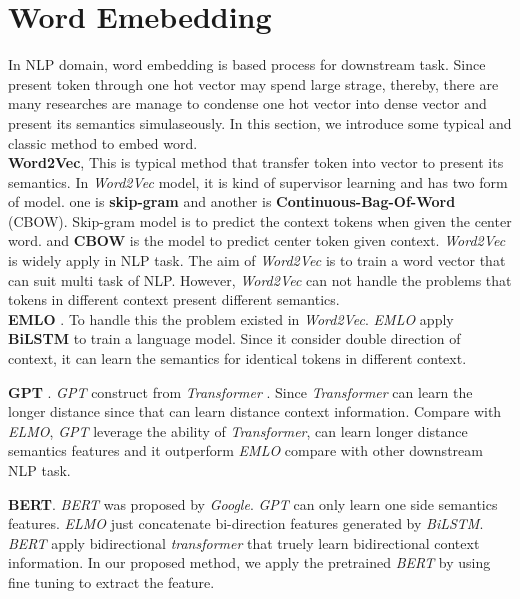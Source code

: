 \section{Word Emebedding}
In NLP domain, word embedding is based process for downstream task. Since present token through one hot vector may spend large strage, thereby, there are many researches are manage to condense one hot vector into dense vector and present its semantics simulaseously. In this section, we introduce some typical and classic method to embed word.\\

\textbf{Word2Vec}\cite{}, This is typical method that transfer token into vector to present its semantics. In \textit{Word2Vec} model, it is kind of supervisor learning and has two form of model. one is \textbf{skip-gram} and another is \textbf{Continuous-Bag-Of-Word} (CBOW). Skip-gram model is to predict the context tokens when given the center word. and \textbf{CBOW} is the model to predict center token given context. \textit{Word2Vec} is widely apply in NLP task. The aim of \textit{Word2Vec} is to train a word vector that can suit multi task of NLP. However, \textit{Word2Vec} can not handle the problems that tokens in different context present different semantics. \\

\textbf{EMLO} \cite{}. To handle this the problem existed in \textit{Word2Vec}. \textit{EMLO} apply \textbf{BiLSTM} to train a language model. Since it consider double direction of context, it can learn the semantics for identical tokens in different context. 

\textbf{GPT} \cite{}. \textit{GPT} construct from \textit{Transformer} \cite{}. Since \textit{Transformer} can learn the longer distance since that can learn distance context information. Compare with \textit{ELMO}, \textit{GPT} leverage the ability of \textit{Transformer}, can learn longer distance semantics features and it outperform \textit{EMLO} compare with other downstream NLP task.

\textbf{BERT}. \textit{BERT} was proposed by \textit{Google}. \textit{GPT} can only learn one side semantics features. \textit{ELMO} just concatenate bi-direction features generated by \textit{BiLSTM}.  \textit{BERT}\cite{} apply bidirectional \textit{transformer} that truely learn bidirectional context information. In our proposed method, we apply the pretrained \textit{BERT} by using fine tuning to extract the feature. 
